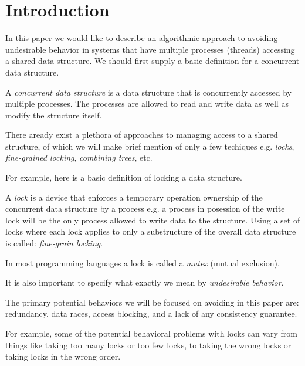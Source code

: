 \section{Introduction}

In this paper we would like to describe an algorithmic approach to avoiding undesirable behavior in systems that have multiple processes (threads) accessing a shared data structure. We should first supply a basic definition for a concurrent data structure.

\begin{con-def}
	\label{cds}
	A \textit{concurrent data structure} is a data structure that is concurrently accessed by multiple processes. The processes are allowed to read and write data as well as modify the structure itself.
\end{con-def}

There aready exist a plethora of approaches to managing access to a shared structure, of which we will make brief mention of only a few techiques e.g. \textit{locks}, \textit{fine-grained locking}, \textit{combining trees}, etc.

For example, here is a basic definition of locking a data structure.

\begin{con-def}[Locking]
	\label{locks}
	A \textit{lock} is a device that enforces a temporary operation ownership of the concurrent data structure by a process e.g. a process in posession of the write lock will be the only process allowed to write data to the structure. Using a set of locks where each lock applies to only a substructure of the overall data structure is called: \textit{fine-grain locking}.
\end{con-def}

In most programming languages a lock is called a \textit{mutex} (mutual exclusion).

It is also important to specify what exactly we mean by \textit{undesirable behavior}.

\begin{con-def}
	\label{ub}
	The primary potential behaviors we will be focused on avoiding in this paper are: redundancy, data races, access blocking, and a lack of any consistency guarantee.
\end{con-def}

For example, some of the potential behavioral problems with locks can vary from things like taking too many locks or too few locks, to taking the wrong locks or taking locks in the wrong order.

